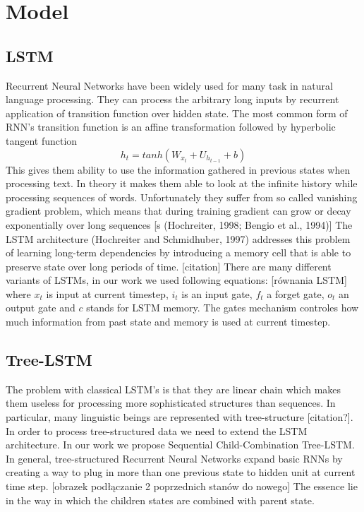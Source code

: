 \documentclass[10pt, a4paper]{article}
\begin{document}
\section{Model} 


\subsection{LSTM}

Recurrent Neural Networks have been widely used for many task in natural language processing. They can process the arbitrary long inputs by recurrent application of transition function over hidden state. 
	The most common form of RNN's transition function is an affine transformation followed by hyperbolic tangent function
	\begin{equation} h_t = tanh(W_{x_t}+U_{h_{t-1}}+b)
\end{equation}
	  	This gives them ability to use the information gathered in previous states when processing text. In theory it makes them able to look at the infinite history while processing sequences of words. 	Unfortunately they suffer from so called vanishing gradient problem, which means that during training gradient can grow or decay exponentially over long sequences [s (Hochreiter,
1998; Bengio et al., 1994)]
	The LSTM architecture (Hochreiter and Schmidhuber, 1997) addresses this problem of learning long-term dependencies by introducing a memory cell that is able to preserve state over long periods of time. [citation]
		There are many different variants of LSTMs, in our work we used following equations:
		[równania LSTM]		
		where $x_t$ is input at current timestep, $i_t$ is an input gate, $f_t$ a forget gate, $o_t$ an output gate and $c$ stands for LSTM memory.
		The gates mechanism controles how much information from past state and memory is used at current timestep. 

\subsection{Tree-LSTM}
	The problem with classical LSTM's is that they are linear chain which makes them useless for processing more sophisticated structures than sequences. In particular, many linguistic beings are represented with tree-structure [citation?].
	In order to process tree-structured data we need to extend the LSTM architecture. In our work we propose Sequential Child-Combination Tree-LSTM.
	In general, tree-structured Recurrent Neural Networks expand basic RNNs by creating a way to plug in more than one previous state to hidden unit at current time step.
	[obrazek podłączanie 2 poprzednich stanów do nowego]
	The essence lie in the way in which the children states are combined with parent state.
\end{document}
